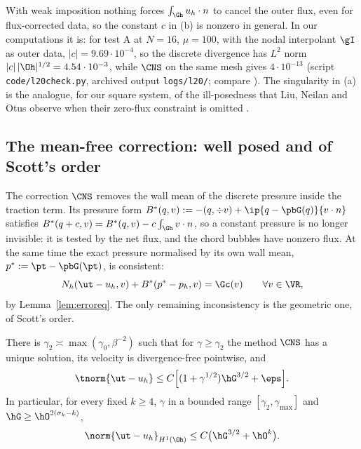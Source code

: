With weak imposition nothing forces $\int_{\Gh}u_h\cdot n$ to cancel the outer flux, even for flux-corrected data, so the constant $c$ in (b) is nonzero in general. In our computations it is: for test A at $N=16$, $\mu=100$, with the nodal interpolant $\gI$ as outer data, $|c|=9.69\cdot10^{-4}$, so the discrete divergence has $L^2$ norm $|c|\,|\Oh|^{1/2}=4.54\cdot10^{-3}$, while $\CNS$ on the same mesh gives $4\cdot10^{-13}$ (script \texttt{code/l20check.py}, archived output \texttt{logs/l20/}; compare \cite[(5.9)]{FrachonNilssonZahedi2024}). The singularity in (a) is the analogue, for our square system, of the ill-posedness that Liu, Neilan and Otus observe when their zero-flux constraint is omitted \cite[Remark~3.2]{LiuNeilanOtus2023}.

\subsection{The mean-free correction: well posed and of Scott's order}
The correction $\CNS$ removes the wall mean of the discrete pressure inside the traction term. Its pressure form $B^\ast(q,v):=-(q,\div v)+\ip{q-\pbG(q)}{v\cdot n}$ satisfies $B^\ast(q+c,v)=B^\ast(q,v)-c\int_{\Gh}v\cdot n$, so a constant pressure is no longer invisible: it is tested by the net flux, and the chord bubbles have nonzero flux. At the same time the exact pressure normalised by its own wall mean, $p^\ast:=\pt-\pbG(\pt)$, is consistent:
\begin{equation}\label{eq:cnserr}
N_h(\ut-u_h,v)+B^\ast(p^\ast-p_h,v)=\Gc(v)\qquad\forall v\in\VR ,
\end{equation}
by Lemma~\ref{lem:erroreq}. The only remaining inconsistency is the geometric one, of Scott's order.

\begin{theorem}\label{thm:D}
There is $\gamma_2\asymp\max(\gamma_0,\beta^{-2})$ such that for $\gamma\ge\gamma_2$ the method $\CNS$ has a unique solution, its velocity is divergence-free pointwise, and
\[
\tnorm{\ut-u_h}\le C\Bigl[(1+\gamma^{1/2})\hG^{3/2}+\eps\Bigr].
\]
In particular, for every fixed $k\ge4$, $\gamma$ in a bounded range $[\gamma_2,\gamma_{\max}]$ and $\hG\ge\hO^{2(\sigma_k-k)}$,
\[
\norm{\ut-u_h}_{H^1(\Oh)}\le C\bigl(\hG^{3/2}+\hO^{k}\bigr).
\]
\end{theorem}

